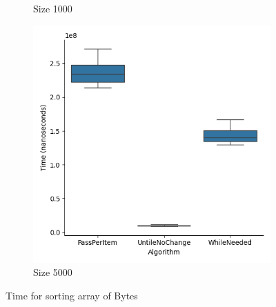 \documentclass{article}
\begin{document}
\begin{figure}[ht]
\begin{subfigure}{0.3\textwidth}
    \caption{Size 1000}
    \label{fig:img2}
  \end{subfigure}
  \begin{subfigure}{0.3\textwidth}
    \centering
    \includegraphics[width=\linewidth]{../figureByte5000.png}
    \caption{Size 5000}
    \label{fig:img3}
  \end{subfigure}
  \caption{Time for sorting array of Bytes}
  \label{fig:three_images}
\end{figure}
\end{document}

